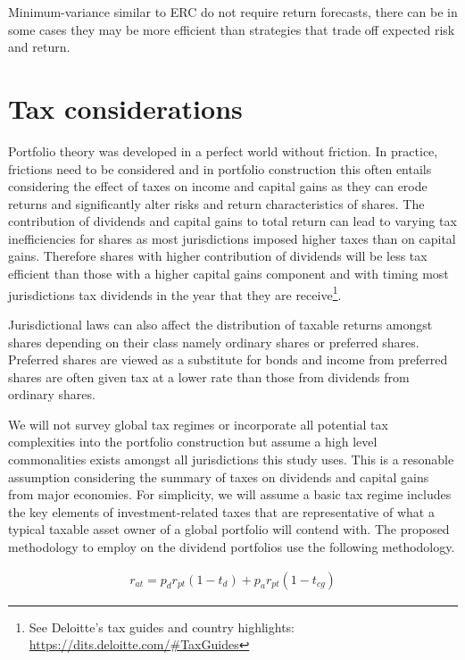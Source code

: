 \documentclass[11pt,preprint, authoryear]{elsarticle}
\numberwithin{equation}{section}
\numberwithin{figure}{section}
\numberwithin{table}{section}
\let\rmarkdownfootnote\footnote%
\def\footnote{\protect\rmarkdownfootnote}
\begin{document}
Minimum-variance similar to ERC do not require return forecasts, there
can be in some cases they may be more efficient than strategies that
trade off expected risk and return.

\hypertarget{tax-considerations}{%
\section{Tax considerations}\label{tax-considerations}}

Portfolio theory was developed in a perfect world without friction. In
practice, frictions need to be considered and in portfolio construction
this often entails considering the effect of taxes on income and capital
gains as they can erode returns and significantly alter risks and return
characteristics of shares. The contribution of dividends and capital
gains to total return can lead to varying tax inefficiencies for shares
as most jurisdictions imposed higher taxes than on capital gains.
Therefore shares with higher contribution of dividends will be less tax
efficient than those with a higher capital gains component and with
timing most jurisdictions tax dividends in the year that they are
receive\footnote{See Deloitte's tax guides and country highlights:
  \url{https://dits.deloitte.com/\#TaxGuides}}.

Jurisdictional laws can also affect the distribution of taxable returns
amongst shares depending on their class namely ordinary shares or
preferred shares. Preferred shares are viewed as a substitute for bonds
and income from preferred shares are often given tax at a lower rate
than those from dividends from ordinary shares.

We will not survey global tax regimes or incorporate all potential tax
complexities into the portfolio construction but assume a high level
commonalities exists amongst all jurisdictions this study uses. This is
a resonable assumption considering the summary of taxes on dividends and
capital gains from major economies. For simplicity, we will assume a
basic tax regime includes the key elements of investment-related taxes
that are representative of what a typical taxable asset owner of a
global portfolio will contend with. The proposed methodology to employ
on the dividend portfolios use the following methodology.

\begin{align}
r_{a t}=p_d r_{p t}\left(1-t_d\right)+p_a r_{p t}\left(1-t_{c g}\right)
\end{align}
\end{document}
